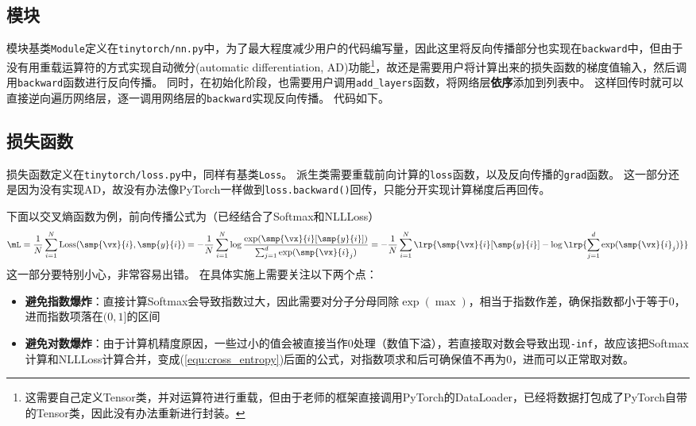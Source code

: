 \documentclass[logo,reportComp]{thesis}
\begin{document}
\subsection{模块}
模块基类\verb'Module'定义在\verb'tinytorch/nn.py'中，为了最大程度减少用户的代码编写量，因此这里将反向传播部分也实现在\verb'backward'中，但由于没有用重载运算符的方式实现自动微分(automatic differentiation, AD)功能\footnote{这需要自己定义Tensor类，并对运算符进行重载，但由于老师的框架直接调用PyTorch的DataLoader，已经将数据打包成了PyTorch自带的Tensor类，因此没有办法重新进行封装。}，故还是需要用户将计算出来的损失函数的梯度值输入，然后调用\verb'backward'函数进行反向传播。
同时，在初始化阶段，也需要用户调用\verb'add_layers'函数，将网络层\textbf{依序}添加到列表中。
这样回传时就可以直接逆向遍历网络层，逐一调用网络层的\verb'backward'实现反向传播。
代码如下。


\subsection{损失函数}
损失函数定义在\verb'tinytorch/loss.py'中，同样有基类\verb'Loss'。
派生类需要重载前向计算的\verb'loss'函数，以及反向传播的\verb'grad'函数。
这一部分还是因为没有实现AD，故没有办法像PyTorch一样做到\verb'loss.backward()'回传，只能分开实现计算梯度后再回传。

下面以交叉熵函数为例，前向传播公式为（已经结合了Softmax和NLLLoss）
\begin{equation}
\label{equ:cross_entropy}
\mL=\frac{1}{N}\sum_{i=1}^N\mathrm{Loss}(\smp{\vx}{i},\smp{y}{i})
=-\frac{1}{N}\sum_{i=1}^N\log\frac{\exp(\smp{\vx}{i}[\smp{y}{i}])}{\sum_{j=1}^d\exp(\smp{\vx}{i}_j)}
=-\frac{1}{N}\sum_{i=1}^N\lrp{\smp{\vx}{i}[\smp{y}{i}]-\log\lrp{\sum_{j=1}^d\exp(\smp{\vx}{i}_j)}}
\end{equation}
这一部分要特别小心，非常容易出错。
在具体实施上需要关注以下两个点：
\begin{itemize}
	\item \textbf{避免指数爆炸}：直接计算Softmax会导致指数过大，因此需要对分子分母同除$\exp(\max)$，相当于指数作差，确保指数都小于等于$0$，进而指数项落在$(0,1]$的区间
	\item \textbf{避免对数爆炸}：由于计算机精度原因，一些过小的值会被直接当作$0$处理（数值下溢），若直接取对数会导致出现\verb'-inf'，故应该把Softmax计算和NLLLoss计算合并，变成(\ref{equ:cross_entropy})后面的公式，对指数项求和后可确保值不再为$0$，进而可以正常取对数。
\end{itemize}
\end{document}
